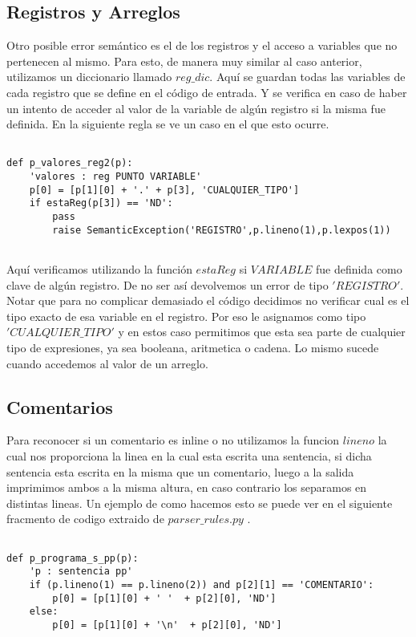\subsection{Registros y Arreglos}

Otro posible error semántico es el de los registros y el acceso a variables que no pertenecen al mismo. Para esto, de manera muy similar al caso anterior, utilizamos un diccionario llamado $reg\_dic$. Aquí se guardan todas las variables de cada registro que se define en el código de entrada. Y se verifica en caso de haber un intento de acceder al valor de la variable de algún registro si la misma fue definida. En la siguiente regla se ve un caso en el que esto ocurre.

\begin{verbatim}

def p_valores_reg2(p):
    'valores : reg PUNTO VARIABLE'
    p[0] = [p[1][0] + '.' + p[3], 'CUALQUIER_TIPO']
    if estaReg(p[3]) == 'ND':
        pass
        raise SemanticException('REGISTRO',p.lineno(1),p.lexpos(1))


\end{verbatim}

Aquí verificamos utilizando la función $estaReg$ si $VARIABLE$ fue definida como clave de algún registro. De no ser así devolvemos un error de tipo $'REGISTRO'$. Notar que para no complicar demasiado el código decidimos no verificar cual es el tipo exacto de esa variable en el registro. Por eso le asignamos como tipo $'CUALQUIER\_TIPO'$ y en estos caso permitimos que esta sea parte de cualquier tipo de expresiones, ya sea booleana, aritmetica o cadena. Lo mismo sucede cuando accedemos al valor de un arreglo.

\subsection{Comentarios}

Para reconocer si un comentario es inline o no utilizamos la funcion $lineno$ la cual nos proporciona la linea en la cual esta escrita una sentencia, si dicha sentencia esta escrita en la misma que un comentario, luego a la salida imprimimos ambos a la misma altura, en caso contrario los separamos en distintas lineas. Un ejemplo de como hacemos esto se puede ver en el siguiente fracmento de codigo extraido de $parser\_rules.py$ .

\begin{verbatim}

def p_programa_s_pp(p):
    'p : sentencia pp'
    if (p.lineno(1) == p.lineno(2)) and p[2][1] == 'COMENTARIO':    	
        p[0] = [p[1][0] + ' '  + p[2][0], 'ND']
    else:
        p[0] = [p[1][0] + '\n'  + p[2][0], 'ND']

\end{verbatim} 

